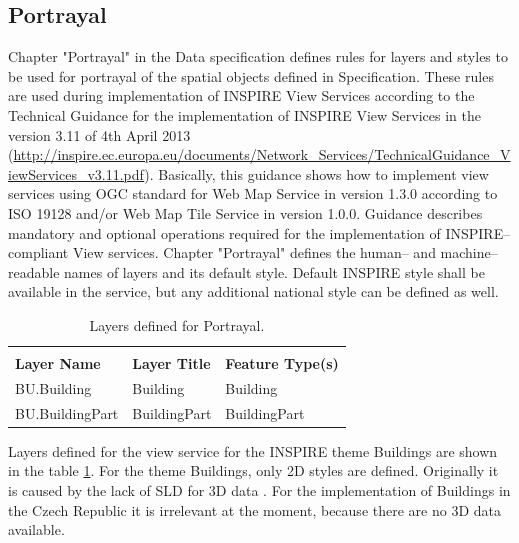 \documentclass[eprint]{actapoly}
\begin{document}
\subsection{Portrayal}
\label{sec:portrayal}

Chapter "Portrayal" in the Data specification defines rules for layers and styles to be used for portrayal of the spatial objects defined in Specification. These rules are used during implementation of INSPIRE View Services according to the Technical Guidance for the implementation of INSPIRE View Services in the version 3.11 of 4th April 2013 (\url{http://inspire.ec.europa.eu/documents/Network_Services/TechnicalGuidance_ViewServices_v3.11.pdf}). Basically, this guidance shows how to implement view services using OGC standard for Web Map Service in version 1.3.0 according to ISO 19128 and/or Web Map Tile Service in version 1.0.0. Guidance describes mandatory and optional operations required for the implementation of INSPIRE--compliant View services. Chapter "Portrayal" defines the human-- and machine--readable names of layers and its default style. Default INSPIRE style shall be available in the service, but any additional national style can be defined as well.

\begin{table}
\centering
\begin{tabular}{lll}
\toprule\\
\bfseries Layer Name & \bfseries Layer Title & \bfseries Feature Type(s)
\\\Midrule
BU.Building & Building & Building
\\\midrule
BU.BuildingPart & BuildingPart & BuildingPart
\\\bottomrule
\end{tabular}
\caption{Layers defined for Portrayal.}
\label{tab:layers}
\end{table}

Layers defined for the view service for the INSPIRE theme Buildings are shown in the table \ref{tab:layers}. For the theme Buildings, only 2D styles are defined. Originally it is caused by the lack of SLD for 3D data \cite{Data SPceification ON Buildings -- http://inspire.ec.europa.eu/documents/Data_Specifications/INSPIRE_DataSpecification_BU_v3.0.pdf}. For the implementation of Buildings in the Czech Republic it is irrelevant at the moment, because there are no 3D data available.
\end{document}
